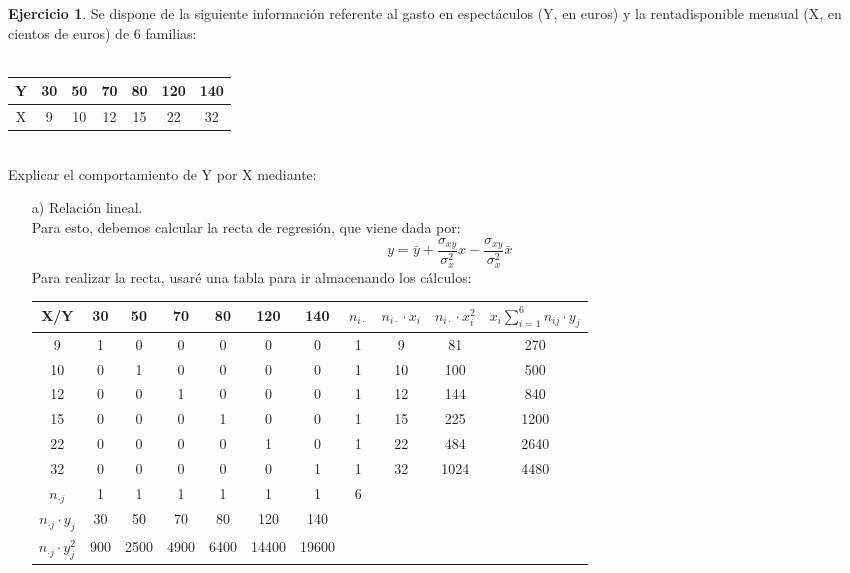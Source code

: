 \documentclass[a4paper, 12pt]{article}
\theoremstyle{definition}
\newtheorem{ej}{Ejercicio}
\begin{document}
\begin{ej}
Se dispone de la siguiente información referente al gasto en espectáculos (Y, en euros) y la rentadisponible mensual (X, en cientos de euros) de 6 familias: \\ \\
\centering
\begin{tabular}{c|cccccc}
    Y & 30 & 50 & 70 & 80 & 120 & 140\\ \hline
    X & 9 & 10 & 12 & 15 & 22 & 32
\end{tabular} \\
Explicar el comportamiento de Y por X mediante: \\
\begin{enumerate}
    \item[a) ] Relación lineal. \\
    Para esto, debemos calcular la recta de regresión, que viene dada por:
    $$y = \bar{y} + \frac{\sigma_{xy}}{\sigma_x^2}x - \frac{\sigma_{xy}}{\sigma_x^2}\bar{x}$$
    Para realizar la recta, usaré una tabla para ir almacenando los cálculos: \\
    \begin{tabular}{c|cccccccccc}
    X/Y & 30 & 50 & 70 & 80 & 120 & 140 & $n_{i \cdot}$ & $n_{i \cdot} \cdot x_i$ &  $n_{i \cdot} \cdot x_i^2$ & $x_i \displaystyle \sum_{i = 1}^6 n_{ij} \cdot y_j$\\ \hline
    9 & 1 & 0 & 0 & 0 & 0 & 0 & 1 & 9 & 81 & 270 \\
    10 & 0 & 1 & 0 & 0 & 0 & 0 & 1 & 10 & 100 & 500 \\
    12 & 0 & 0 & 1 & 0 & 0 & 0 & 1 & 12& 144 & 840 \\
    15 & 0 & 0 & 0 & 1 & 0 & 0 & 1 & 15 & 225 & 1200 \\
    22 & 0 & 0 & 0 & 0 & 1 & 0 & 1 & 22 & 484 & 2640 \\
    32 & 0 & 0 & 0 & 0 & 0 & 1 & 1 & 32 & 1024 & 4480 \\
    $n_{\cdot j}$ & 1 & 1 & 1 & 1 & 1 & 1 & 6 & & & \vline 9930 \vline \\
    $n_{\cdot j} \cdot y_j$ & 30 & 50 & 70 & 80 & 120 & 140 & & & &\\
    $n_{\cdot j} \cdot y_j^2$ & 900 & 2500 & 4900 & 6400 & 14400 & 19600
    \end{tabular}
    

\end{enumerate}
\end{ej}
\end{document}
